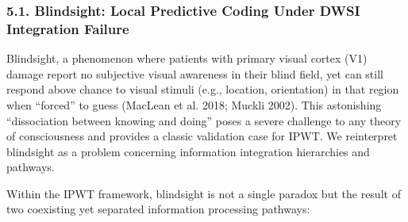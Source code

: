 \documentclass[
  a4paper]{article}
\begin{document}
\subsubsection{5.1. Blindsight: Local Predictive Coding Under DWSI
Integration
Failure}\label{blindsight-local-predictive-coding-under-dwsi-integration-failure}

Blindsight, a phenomenon where patients with primary visual cortex (V1)
damage report no subjective visual awareness in their blind field, yet
can still respond above chance to visual stimuli (e.g., location,
orientation) in that region when ``forced'' to guess (MacLean et al.
2018; Muckli 2002). This astonishing ``dissociation between knowing and
doing'' poses a severe challenge to any theory of consciousness and
provides a classic validation case for IPWT. We reinterpret blindsight
as a problem concerning information integration hierarchies and
pathways.

Within the IPWT framework, blindsight is not a single paradox but the
result of two coexisting yet separated information processing pathways:
\end{document}
